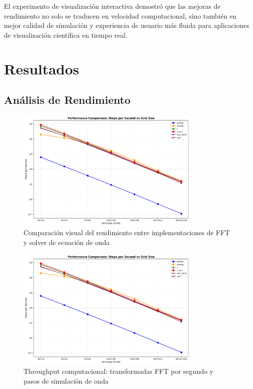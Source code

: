 \documentclass[a4paper]{article}
\begin{document}
El experimento de visualización interactiva demostró que las mejoras de rendimiento no solo se traducen en velocidad computacional, sino también en mejor calidad de simulación y experiencia de usuario más fluida para aplicaciones de visualización científica en tiempo real.

\section{Resultados}

\subsection{Análisis de Rendimiento}

\begin{figure}[h]
    \centering
    \includegraphics[width=0.8\textwidth]{../results/steps_per_second.png}
    \caption{Comparación visual del rendimiento entre implementaciones de FFT y solver de ecuación de onda}
    \label{fig:performance}
\end{figure}

\begin{figure}[h]
    \centering
    \includegraphics[width=0.8\textwidth]{../results/steps_per_second.png}
    \caption{Throughput computacional: transformadas FFT por segundo y pasos de simulación de onda}
    \label{fig:throughput}
\end{figure}
\end{document}
